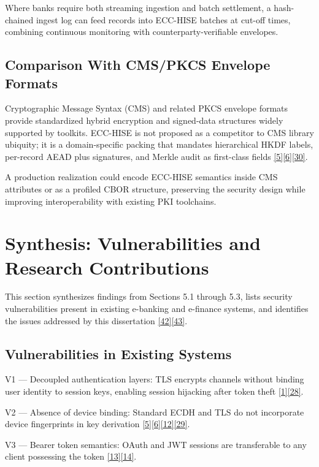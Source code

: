 \indent Where banks require both streaming ingestion and batch settlement, a hash-chained ingest log can feed records into ECC-HISE batches at cut-off times, combining continuous monitoring with counterparty-verifiable envelopes.

\subsection{Comparison With CMS/PKCS Envelope Formats}

\indent Cryptographic Message Syntax (CMS) and related PKCS envelope formats provide standardized hybrid encryption and signed-data structures widely supported by toolkits. ECC-HISE is not proposed as a competitor to CMS library ubiquity; it is a domain-specific packing that mandates hierarchical HKDF labels, per-record AEAD plus signatures, and Merkle audit as first-class fields \hyperref[ref:5]{[5]}\hyperref[ref:6]{[6]}\hyperref[ref:30]{[30]}.

\indent A production realization could encode ECC-HISE semantics inside CMS attributes or as a profiled CBOR structure, preserving the security design while improving interoperability with existing PKI toolchains.

\section{Synthesis: Vulnerabilities and Research Contributions}

\indent This section synthesizes findings from Sections 5.1 through 5.3, lists security vulnerabilities present in existing e-banking and e-finance systems, and identifies the issues addressed by this dissertation \hyperref[ref:42]{[42]}\hyperref[ref:43]{[43]}.

\subsection{Vulnerabilities in Existing Systems}

\indent V1 --- Decoupled authentication layers: TLS encrypts channels without binding user identity to session keys, enabling session hijacking after token theft \hyperref[ref:1]{[1]}\hyperref[ref:28]{[28]}.

\indent V2 --- Absence of device binding: Standard ECDH and TLS do not incorporate device fingerprints in key derivation \hyperref[ref:5]{[5]}\hyperref[ref:6]{[6]}\hyperref[ref:12]{[12]}\hyperref[ref:29]{[29]}.

\indent V3 --- Bearer token semantics: OAuth and JWT sessions are transferable to any client possessing the token \hyperref[ref:13]{[13]}\hyperref[ref:14]{[14]}.

